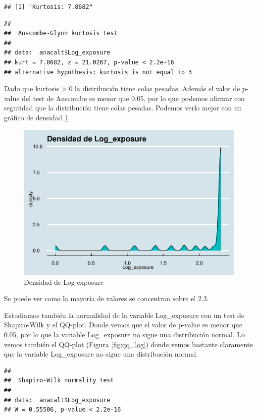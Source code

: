 \documentclass[
]{article}
\begin{document}
\begin{verbatim}
## [1] "Kurtosis: 7.8682"
\end{verbatim}

\begin{verbatim}
## 
##  Anscombe-Glynn kurtosis test
## 
## data:  anacalt$Log_exposure
## kurt = 7.8682, z = 21.0267, p-value < 2.2e-16
## alternative hypothesis: kurtosis is not equal to 3
\end{verbatim}

Dado que kurtosis \textgreater{} 0 la distribución tiene colas pesadas.
Además el valor de p-value del test de Anscombe es menor que 0.05, por
lo que podemos afirmar con seguridad que la distribución tiene colas
pesadas. Podemos verlo mejor con un gráfico de densidad
\ref{fig:densidad_log}.

\begin{figure}

{\centering \includegraphics[width=0.5\linewidth]{anacalt-regresion_files/figure-latex/densidad_log-1} 

}

\caption{Densidad de Log exposure}\label{fig:densidad_log}
\end{figure}

Se puede ver como la mayoría de valores se concentran sobre el 2.3.

Estudiamos también la normalidad de la variable Log\_exposure con un
test de Shapiro-Wilk y el QQ-plot. Donde vemos que el valor de p-value
es menor que 0.05, por lo que la variable Log\_exposure no sigue una
distribución normal. Lo vemos también el QQ-plot (Figura
\ref{fig:qq_log}) donde vemos bastante claramente que la variable
Log\_exposure no sigue una distribución normal.

\begin{verbatim}
## 
##  Shapiro-Wilk normality test
## 
## data:  anacalt$Log_exposure
## W = 0.55506, p-value < 2.2e-16
\end{verbatim}
\end{document}
